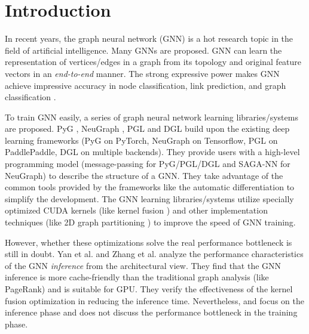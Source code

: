 \section{Introduction}

In recent years, the graph neural network (GNN) is a hot research topic in the field of artificial intelligence.
Many GNNs \cite{kipf2017_gcn, defferrad2016_chebnet, li2018_agcn,li2015_ggnn, hamilton2017_graphsage, huang2018_gat, zhang2018_gaan} are proposed.
GNN can learn the representation of vertices/edges in a graph from its topology and original feature vectors in an \emph{end-to-end} manner.
The strong expressive power makes GNN achieve impressive accuracy in node classification, link prediction, and graph classification \cite{zhou2018_gnn_review, zhang2018_gnn_survey, comprehensive-survey-wu-2020}.

To train GNN easily, a series of graph neural network learning libraries/systems \cite{PyG, DGL, ma2019_neugraph, zhu2019_aligraph, PGL} are proposed.
PyG \cite{PyG}, NeuGraph \cite{ma2019_neugraph}, PGL \cite{PGL} and DGL \cite{DGL} build upon the existing deep learning frameworks (PyG on PyTorch, NeuGraph on Tensorflow, PGL on PaddlePaddle, DGL on multiple backends).
They provide users with a high-level programming model (message-passing for PyG/PGL/DGL and SAGA-NN for NeuGraph) to describe the structure of a GNN.
They take advantage of the common tools provided by the frameworks like the automatic differentiation to simplify the development.
The GNN learning libraries/systems utilize specially optimized CUDA kernels (like kernel fusion \cite{DGL} \cite{ma2019_neugraph}) and other implementation techniques (like 2D graph partitioning \cite{ma2019_neugraph}) to improve the speed of GNN training.

However, whether these optimizations solve the real performance bottleneck is still in doubt.
Yan et al. \cite{yan2020_characterizing_gcn} and Zhang et al. \cite{zhang2020_analysis_neugraph} analyze the performance characteristics of the GNN \emph{inference} from the architectural view.
They find that the GNN inference is more cache-friendly than the traditional graph analysis (like PageRank) and is suitable for GPU.
They verify the effectiveness of the kernel fusion optimization in reducing the inference time.
Nevertheless, \cite{yan2020_characterizing_gcn} and \cite{zhang2020_analysis_neugraph} focus on the inference phase and does not discuss the performance bottleneck in the training phase.

